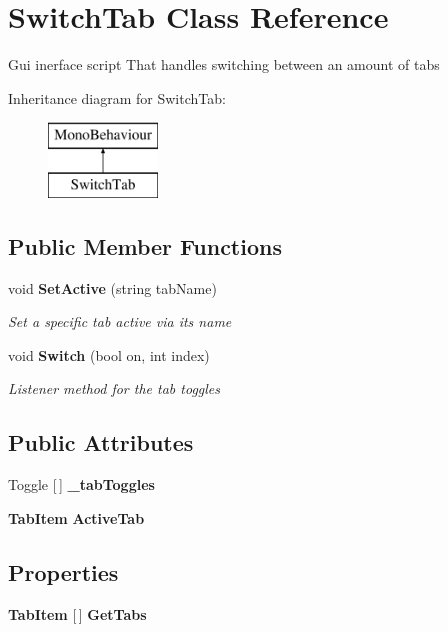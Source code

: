 \section{Switch\+Tab Class Reference}
\label{class_switch_tab}


Gui inerface script That handles switching between an amount of tabs  


Inheritance diagram for Switch\+Tab\+:\begin{figure}[H]
\begin{center}
\leavevmode
\includegraphics[height=2.000000cm]{class_switch_tab}
\end{center}
\end{figure}
\subsection*{Public Member Functions}
\begin{DoxyCompactItemize}
\item 
void \textbf{ Set\+Active} (string tab\+Name)
\begin{DoxyCompactList}\small\item\em Set a specific tab active via its name \end{DoxyCompactList}\item 
void \textbf{ Switch} (bool on, int index)
\begin{DoxyCompactList}\small\item\em Listener method for the tab toggles \end{DoxyCompactList}\end{DoxyCompactItemize}
\subsection*{Public Attributes}
\begin{DoxyCompactItemize}
\item 
Toggle [$\,$] \textbf{ \+\_\+tab\+Toggles}
\item 
\textbf{ Tab\+Item} \textbf{ Active\+Tab}
\end{DoxyCompactItemize}
\subsection*{Properties}
\begin{DoxyCompactItemize}
\item 
\textbf{ Tab\+Item} [$\,$] \textbf{ Get\+Tabs}\hspace{0.3cm}{\ttfamily  [get]}
\end{DoxyCompactItemize}


